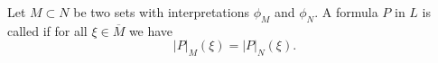 Let $M \subset N$ be two sets with interpretations $\phi_M$ and $\phi_N$. A formula $P$ in $L$ is called  if for all $\xi \in \overline{M}$ we have
$$|P|_M(\xi) = |P|_N(\xi).$$

